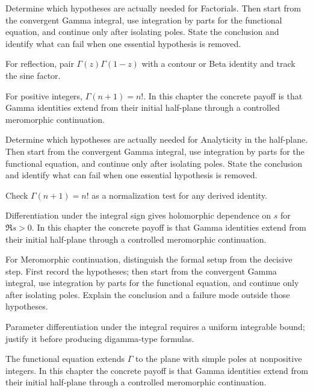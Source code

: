 \begin{exercise}\label{exr:iv19-04}
Determine which hypotheses are actually needed for Factorials. Then start from the convergent Gamma integral, use integration by parts for the functional equation, and continue only after isolating poles. State the conclusion and identify what can fail when one essential hypothesis is removed.
\end{exercise}
\begin{hint}
For reflection, pair \(\Gamma(z)\Gamma(1-z)\) with a contour or Beta identity and track the sine factor.
\end{hint}
\begin{solution}
For positive integers, $\Gamma(n+1)=n!$. In this chapter the concrete payoff is that Gamma identities extend from their initial half-plane through a controlled meromorphic continuation.
\end{solution}

\begin{exercise}\label{exr:iv19-05}
Determine which hypotheses are actually needed for Analyticity in the half-plane. Then start from the convergent Gamma integral, use integration by parts for the functional equation, and continue only after isolating poles. State the conclusion and identify what can fail when one essential hypothesis is removed.
\end{exercise}
\begin{hint}
Check \(\Gamma(n+1)=n!\) as a normalization test for any derived identity.
\end{hint}
\begin{solution}
Differentiation under the integral sign gives holomorphic dependence on $s$ for $\Re s>0$. In this chapter the concrete payoff is that Gamma identities extend from their initial half-plane through a controlled meromorphic continuation.
\end{solution}

\begin{exercise}\label{exr:iv19-06}
For Meromorphic continuation, distinguish the formal setup from the decisive step. First record the hypotheses; then start from the convergent Gamma integral, use integration by parts for the functional equation, and continue only after isolating poles. Explain the conclusion and a failure mode outside those hypotheses.
\end{exercise}
\begin{hint}
Parameter differentiation under the integral requires a uniform integrable bound; justify it before producing digamma-type formulas.
\end{hint}
\begin{solution}
The functional equation extends $\Gamma$ to the plane with simple poles at nonpositive integers. In this chapter the concrete payoff is that Gamma identities extend from their initial half-plane through a controlled meromorphic continuation.
\end{solution}

